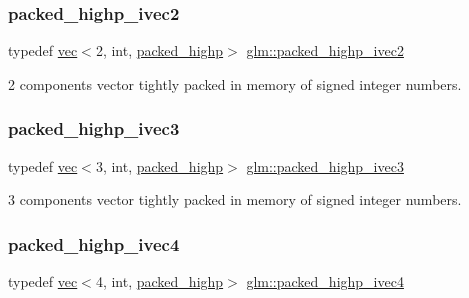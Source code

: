 \subsubsection{\texorpdfstring{packed\+\_\+highp\+\_\+ivec2}{packed\_highp\_ivec2}}
{\footnotesize\ttfamily typedef \mbox{\hyperlink{structglm_1_1vec}{vec}}$<$2, int, \mbox{\hyperlink{namespaceglm_a36ed105b07c7746804d7fdc7cc90ff25a8e8791ee77fe079b1291f710d88031bf}{packed\+\_\+highp}}$>$ \mbox{\hyperlink{group__gtc__type__aligned_gae362d70a8be88cc43b6c1ec0992e73db}{glm\+::packed\+\_\+highp\+\_\+ivec2}}}



2 components vector tightly packed in memory of signed integer numbers. 

\mbox{\label{group__gtc__type__aligned_ga56b9f0123506edc416bbcf957d3ce678}} 
\subsubsection{\texorpdfstring{packed\+\_\+highp\+\_\+ivec3}{packed\_highp\_ivec3}}
{\footnotesize\ttfamily typedef \mbox{\hyperlink{structglm_1_1vec}{vec}}$<$3, int, \mbox{\hyperlink{namespaceglm_a36ed105b07c7746804d7fdc7cc90ff25a8e8791ee77fe079b1291f710d88031bf}{packed\+\_\+highp}}$>$ \mbox{\hyperlink{group__gtc__type__aligned_ga56b9f0123506edc416bbcf957d3ce678}{glm\+::packed\+\_\+highp\+\_\+ivec3}}}



3 components vector tightly packed in memory of signed integer numbers. 

\mbox{\label{group__gtc__type__aligned_gabf988b7dc66612bc1d4c9ce44d5b5642}} 
\subsubsection{\texorpdfstring{packed\+\_\+highp\+\_\+ivec4}{packed\_highp\_ivec4}}
{\footnotesize\ttfamily typedef \mbox{\hyperlink{structglm_1_1vec}{vec}}$<$4, int, \mbox{\hyperlink{namespaceglm_a36ed105b07c7746804d7fdc7cc90ff25a8e8791ee77fe079b1291f710d88031bf}{packed\+\_\+highp}}$>$ \mbox{\hyperlink{group__gtc__type__aligned_gabf988b7dc66612bc1d4c9ce44d5b5642}{glm\+::packed\+\_\+highp\+\_\+ivec4}}}



